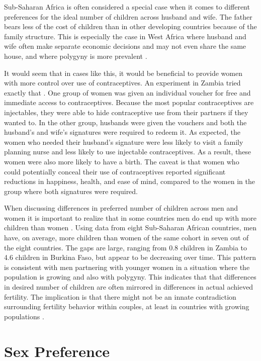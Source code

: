 \documentclass[letterpaper,12pt]{article}
\begin{document}
Sub-Saharan Africa is often considered a special case when it comes to
different preferences for the ideal number of children across husband
and wife. 
The father bears less of the cost of children than in other developing
countries because of the family structure.
This is especially the case in West Africa where husband and wife often 
make separate economic decisions and may not even share the same house,
and where polygyny is more prevalent 
\citep{Caldwell1992,Udry1996,Tertilt2005}. 

It would seem that in cases like this, it would be beneficial to provide
women with more control over use of contraceptives. 
An experiment in Zambia tried exactly that \citep{Ashraf2014}. 
One group of women was given an individual voucher for free and
immediate access to contraceptives. 
Because the most popular contraceptives are injectables, they were able
to hide contraceptive use from their partners if they wanted to. 
In the other group, husbands were given the vouchers and both the
husband's and wife's signatures were required to redeem it. 
As expected, the women who needed their husband's signature were less
likely to visit a family planning nurse and less likely to use
injectable contraceptives. 
As a result, these women were also more likely to have a birth. 
The caveat is that women who could potentially conceal their use of
contraceptives reported significant reductions in happiness, health, and
ease of mind, compared to the women in the group where both signatures
were required.

When discussing differences in preferred number of children across men
and women it is important to realize that in some countries men do end
up with more children than women \citep{Field2016}. 
Using data from eight Sub-Saharan African countries, men have, on
average, more children than women of the same cohort in seven out of the
eight countries. 
The gaps are large, ranging from 0.8 children in Zambia to 4.6 children
in Burkina Faso, but appear to be decreasing over time. 
This pattern is consistent with men partnering with younger women in a
situation where the population is growing and also with polygyny. 
This indicates that that differences in desired number of children are
often mirrored in differences in actual achieved fertility. 
The implication is that there might not be an innate contradiction
surrounding fertility behavior within couples, at least in countries
with growing populations \citep{Field2016}.

\section{Sex Preference}\label{sex-preference}
\end{document}
